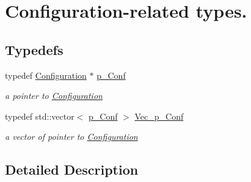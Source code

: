 \hypertarget{group___configuration___t_y_p_e_s}{}\section{Configuration-\/related types.}
\label{group___configuration___t_y_p_e_s}
\subsection*{Typedefs}
\begin{DoxyCompactItemize}
\item 
\mbox{\label{group___configuration___t_y_p_e_s_gae822ccc553e79ddf75bfd260c2b995f3}} 
typedef \mbox{\hyperlink{class_s_m_spp__di__unipi__it_1_1_configuration}{Configuration}} $\ast$ \mbox{\hyperlink{group___configuration___t_y_p_e_s_gae822ccc553e79ddf75bfd260c2b995f3}{p\+\_\+\+Conf}}
\begin{DoxyCompactList}\small\item\em a pointer to \mbox{\hyperlink{class_s_m_spp__di__unipi__it_1_1_configuration}{Configuration}} \end{DoxyCompactList}\item 
\mbox{\label{group___configuration___t_y_p_e_s_ga691b40b20a13a75546e21eb39beb512a}} 
typedef std\+::vector$<$ \mbox{\hyperlink{group___configuration___t_y_p_e_s_gae822ccc553e79ddf75bfd260c2b995f3}{p\+\_\+\+Conf}} $>$ \mbox{\hyperlink{group___configuration___t_y_p_e_s_ga691b40b20a13a75546e21eb39beb512a}{Vec\+\_\+p\+\_\+\+Conf}}
\begin{DoxyCompactList}\small\item\em a vector of pointer to \mbox{\hyperlink{class_s_m_spp__di__unipi__it_1_1_configuration}{Configuration}} \end{DoxyCompactList}\end{DoxyCompactItemize}


\subsection{Detailed Description}

